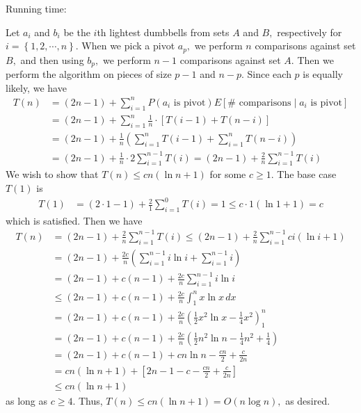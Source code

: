 \documentclass{article}
\begin{document}
\begin{soln}
	Running time:
	\begin{subproof}
		Let $a_i$ and $b_i$ be the $i$th lightest dumbbells from sets $A$ and $B,$ respectively for $i=\left\{ 1, 2, \cdots, n \right\}.$ When we pick a pivot $a_p,$ we perform $n$ comparisons against set $B,$ and then using $b_p,$ we perform $n-1$ comparisons against set $A.$ Then we perform the algorithm on pieces of size $p-1$ and $n-p.$ Since each $p$ is equally likely, we have
		\begin{align*}
			T(n) &= (2n-1) + \sum_{i=1}^{n} P(a_i\text{ is pivot}) E[\#\text{ comparisons}\mid a_i\text{ is pivot}] \\
			&= (2n-1) + \sum_{i=1}^{n}\frac{1}{n}\cdot \left[ T(i-1) + T(n-i) \right] \\
			&= (2n-1) + \frac{1}{n}\left( \sum_{i=1}^{n} T(i-1) + \sum_{i=1}^{n} T(n-i) \right) \\
			&= (2n-1) + \frac{1}{n}\cdot 2\sum_{i=1}^{n-1} T(i) = (2n-1) + \frac{2}{n} \sum_{i=1}^{n-1} T(i)
		\end{align*}
		We wish to show that $T(n)\le cn(\ln n + 1)$ for some $c\ge 1.$ The base case $T(1)$ is
		\begin{align*}
			T(1) &= (2\cdot 1 - 1) + \frac{2}{1}\sum_{i=1}^{0} T(i) = 1 \le c\cdot 1(\ln 1+1) = c
		\end{align*}
		which is satisfied. Then we have
		\begin{align*}
			T(n) &= (2n-1) + \frac{2}{n} \sum_{i=1}^{n-1} T(i) \le (2n-1) + \frac{2}{n} \sum_{i=1}^{n-1} ci(\ln i + 1) \\
			&= (2n-1) + \frac{2c}{n} \left( \sum_{i=1}^{n-1} i\ln i + \sum_{i=1}^{n-1} i \right) \\
			&= (2n-1) + c(n-1) + \frac{2c}{n} \sum_{i=1}^{n-1} i\ln i  \\
			&\le (2n-1) + c(n-1) + \frac{2c}{n}\int_1^n x\ln x\, dx \\
			&= (2n-1) + c(n-1) + \frac{2c}{n} \left( \frac{1}{2}x^2\ln x - \frac{1}{4}x^2 \right)^n_1 \\
			&= (2n-1) + c(n-1) + \frac{2c}{n} \left( \frac{1}{2}n^2\ln n - \frac{1}{4}n^2 + \frac{1}{4} \right) \\
			&= (2n-1) + c(n-1) + cn\ln n - \frac{cn}{2} + \frac{c}{2n} \\
			&= cn(\ln n + 1) + \left[ 2n-1-c - \frac{cn}{2} + \frac{c}{2n} \right] \\
			&\le cn(\ln n+1)
		\end{align*}
		as long as $c\ge 4.$ Thus, $T(n)\le cn(\ln n+1) = O(n\log n),$ as desired.
	\end{subproof}
\end{soln}
\end{document}
